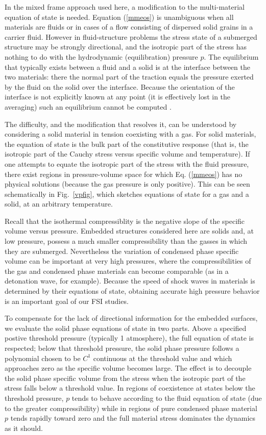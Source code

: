 In the mixed frame approach used here, a modification to the multi-material
equation of state is needed.  Equation (\ref{mmeos}) is unambiguous when all
materials are fluids or in cases of a flow consisting of dispersed solid grains
in a carrier fluid.  However in fluid-structure problems the stress state of a
submerged structure may be strongly directional, and the isotropic part of the
stress has nothing to do with the hydrodynamic (equilibration) pressure $p$.
The equilibrium that typically exists between a fluid and a solid is at the
interface between the two materials: there the normal part of the traction
equals the pressure exerted by the fluid on the solid over the interface.
Because the orientation of the interface is not explicitly known at any
point (it is effectively lost in the averaging) such an equilibrium cannot
be computed
.

The difficulty, and the modification that resolves it, can be understood by
considering a solid material in tension coexisting with a gas.  For solid
materials, the equation of state is the bulk part of the constitutive response
(that is, the isotropic part of the Cauchy stress versus specific volume and
temperature).  If one attempts to equate the isotropic part of the stress
with the fluid pressure, there exist regions in pressure-volume space for
which Eq. (\ref{mmeos}) has no physical solutions (because the gas pressure
is only positive).  This can be seen schematically in Fig.~\ref{vpfig}, which
sketches equations of state for a gas and a solid, at an arbitrary temperature.


Recall that the isothermal compressiblity is the negative slope of the
specific volume versus pressure.  Embedded structures considered here are
solids and, at low pressure, possess a much smaller compressibility than
the gasses in which they are submerged.  Nevertheless the variation of
condensed phase specific volume can be important at very high pressures,
where the compressibilities of the gas and condensed phase materials can
become comparable (as in a detonation wave, for example).  Because the speed of
shock waves in materials is determined by their equations of state, obtaining
accurate high pressure behavior is an important goal of our FSI studies.


To compensate for the lack of directional information for the embedded
surfaces, we evaluate the solid phase equations of state in two parts.
Above a specified postive threshold pressure (typically 1 atmosphere),
the full equation of state is respected; below that threshold pressure, the
solid phase pressure follows a polynomial chosen to be $C^1$ continuous at the
threshold value and which approaches zero as the specific volume becomes large.
The effect is to decouple the solid phase specific volume from the stress when
the isotropic part of the stress falls below a threshold value.  In regions
of coexistence at states below the threshold pressure, $p$ tends to behave
according to the fluid equation of state (due to the greater compressibility)
while in regions of pure condensed phase material $p$ tends rapidly toward
zero and the full material stress dominates the dynamics as it should.


